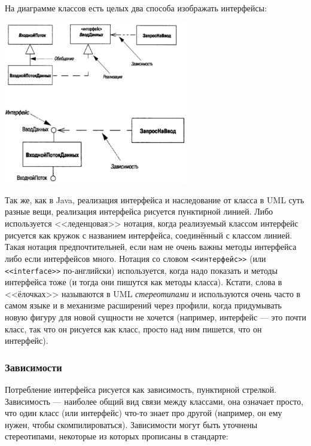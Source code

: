 \documentclass{../../text-style}
\begin{document}
На диаграмме классов есть целых два способа изображать интерфейсы: 

\begin{center}
    \includegraphics[width=0.6\textwidth]{interfaces.png}
\end{center}

Так же, как в Java, реализация интерфейса и наследование от класса в UML суть разные вещи, реализация интерфейса рисуется пунктирной линией. Либо используется <<леденцовая>> нотация, когда реализуемый классом интерфейс рисуется как кружок с названием интерфейса, соединённый с классом линией. Такая нотация предпочтительней, если нам не очень важны методы интерфейса либо если интерфейсов много. Нотация со словом \verb|<<интерфейс>>| (или \verb|<<interface>>| по-английски) используется, когда надо показать и методы интерфейса тоже (и тогда они пишутся как методы класса). Кстати, слова в <<ёлочках>> называются в UML \textit{стереотипами} и используются очень часто в самом языке и в механизме расширений через профили, когда придумывать новую фигуру для новой сущности не хочется (например, интерфейс --- это почти класс, так что он рисуется как класс, просто над ним пишется, что он интерфейс).

\subsubsection{Зависимости}

Потребление интерфейса рисуется как зависимость, пунктирной стрелкой. Зависимость --- наиболее общий вид связи между классами, она означает просто, что один класс (или интерфейс) что-то знает про другой (например, он ему нужен, чтобы скомпилироваться). Зависимости могут быть уточнены стереотипами, некоторые из которых прописаны в стандарте:
\end{document}
